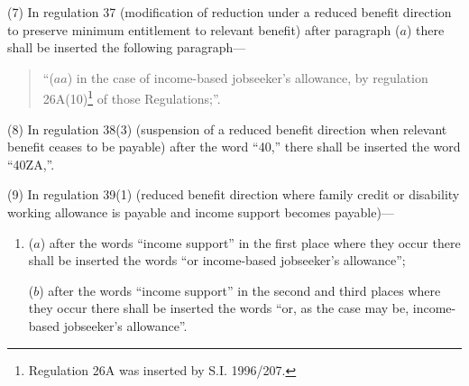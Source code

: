 \documentclass[a4paper]{article}
\begin{document}
(7) In regulation 37 (modification of reduction under a reduced benefit direction to preserve minimum entitlement to relevant benefit) after paragraph ($a$) there shall be inserted the following paragraph—
\begin{quotation}
“($aa$) in the case of income-based jobseeker’s allowance, by regulation 26A(10)\footnote{\frenchspacing Regulation 26A was inserted by S.I. 1996/207.} of those Regulations;”.
\end{quotation}

(8) In regulation 38(3) (suspension of a reduced benefit direction when relevant benefit ceases to be payable) after the word “40,” there shall be inserted the word “40ZA,”.

(9) In regulation 39(1) (reduced benefit direction where family credit or disability working allowance is payable and income support becomes payable)—
\begin{enumerate}\item[]
($a$) after the words “income support” in the first place where they occur there shall be inserted the words “or income-based jobseeker’s allowance”;

($b$) after the words “income support” in the second and third places where they occur there shall be inserted the words “or, as the case may be, income-based jobseeker’s allowance”.
\end{enumerate}
\end{document}
